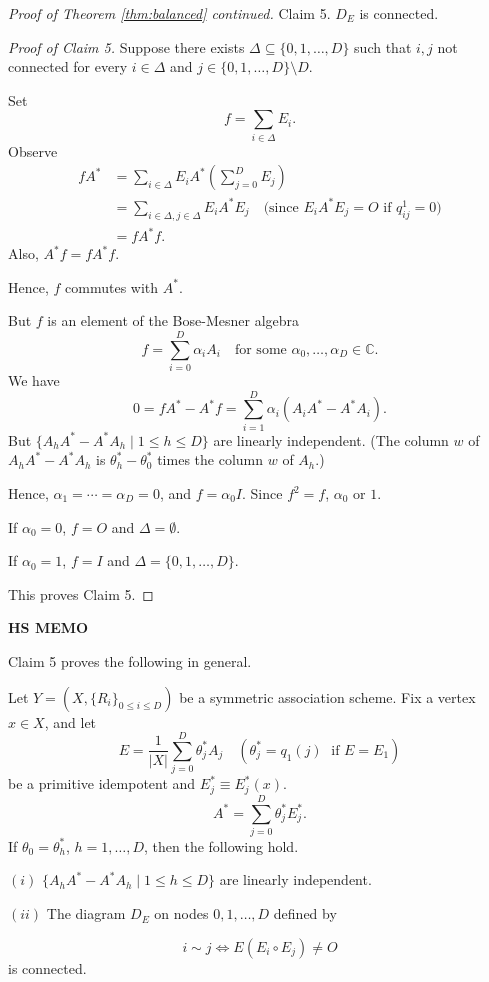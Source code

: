 \documentclass[
]{book}
\theoremstyle{definition}
\theoremstyle{definition}
\theoremstyle{definition}
\theoremstyle{definition}
\theoremstyle{remark}
\begin{document}
\begin{proof}[Proof of Theorem \ref{thm:balanced} continued]
Claim 5. \(D_E\) is connected.

\emph{Proof of Claim 5.}
Suppose there exists \(\Delta \subseteq \{0,1,\ldots, D\}\) such that \(i,j\) not connected for every \(i\in \Delta\) and \(j\in \{0,1,\ldots, D\}\setminus D\).

Set
\[f = \sum_{i\in \Delta}E_i.\]
Observe
\begin{align}
fA^* & = \sum_{i\in \Delta} E_i A^* \left(\sum_{j=0}^D E_j\right)\\
& = \sum_{i\in \Delta, j\in \Delta}E_iA^*E_j \quad \text{(since $E_iA^*E_j=O$ if $q^1_{ij}=0$)}\\
& = fA^*f.
\end{align}
Also, \(A^*f = fA^*f\).

Hence, \(f\) commutes with \(A^*\).

But \(f\) is an element of the Bose-Mesner algebra
\[f = \sum_{i=0}^D \alpha_i A_i \quad \text{for some $\alpha_0, \ldots, \alpha_D\in \mathbb{C}$}.\]
We have
\[0 = fA^*-A^*f = \sum_{i=1}^D \alpha_i(A_iA^*- A^*A_i).\]
But \(\{A_hA^* - A^*A_h \mid 1\leq h\leq D\}\) are linearly independent.
(The column \(w\) of \(A_hA^*-A^*A_h\) is \(\theta^*_h - \theta^*_0\) times the column \(w\) of \(A_h\).)

Hence, \(\alpha_1 = \cdots = \alpha_D = 0\), and \(f = \alpha_0 I\). Since \(f^2 = f\), \(\alpha_0\) or \(1\).

If \(\alpha_0 = 0\), \(f=O\) and \(\Delta = \emptyset\).

If \(\alpha_0 = 1\), \(f=I\) and \(\Delta = \{0, 1, \ldots, D\}\).

This proves Claim 5.

\end{proof}

\textbf{HS MEMO}

Claim 5 proves the following in general.

Let \(Y = (X, \{R_i\}_{0\leq i\leq D})\) be a symmetric association scheme. Fix a vertex \(x\in X\), and let
\[E = \frac{1}{|X|}\sum_{j=0}^D \theta^*_j A_j \quad (\theta^*_j = q_1(j) \; \text{ if $E = E_1$})\]
be a primitive idempotent and \(E^*_j\equiv E^*_j(x)\).
\[A^* = \sum_{j=0}^D \theta_j^*E^*_j.\]
If \(\theta_0 = \theta^*_h\), \(h=1, \ldots, D\), then the following hold.

\((i)\) \(\{A_hA^* - A^*A_h \mid 1\leq h\leq D\}\) are linearly independent.

\((ii)\) The diagram \(D_E\) on nodes \(0, 1, \ldots, D\) defined by

\[i\sim j \Leftrightarrow E(E_i\circ E_j)\neq O\]
is connected.
\end{document}
